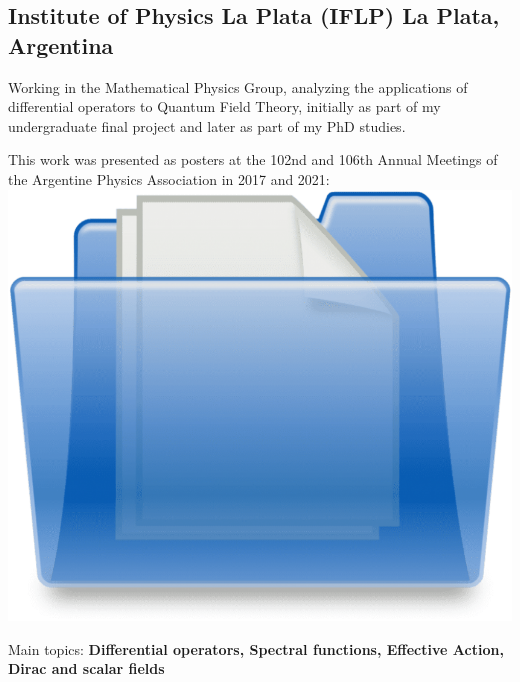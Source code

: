 \subsection{{Institute of Physics La Plata (IFLP) \hfill La Plata, Argentina}}
\begin{zitemize}
\item Working in the Mathematical Physics Group, analyzing the applications of differential operators to Quantum Field Theory, initially as part of my undergraduate final project and later as part of my PhD studies.
\item This work was presented as posters at the 102nd and 106th Annual Meetings of the Argentine Physics Association in 2017 and 2021: \href{https://drive.google.com/drive/folders/1NhlFmvg1QMwYczq2GqnXWXXOQsxqrctO?usp=sharing}{\includegraphics[scale=0.01]{folder.png}}
\item Main topics: \textbf{Differential operators, Spectral functions, Effective Action, Dirac and scalar fields}
\end{zitemize}

